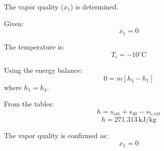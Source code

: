The vapor quality (\( x_1 \)) is determined.  

Given:  
\[
x_1 = 0
\]  

The temperature is:  
\[
T_i = -10^\circ\text{C}
\]  

Using the energy balance:  
\[
0 = \dot{m} \left[ h_4 - h_1 \right]
\]  
where \( h_1 = h_4 \).  

From the tables:  
\[
h = s_{\text{ext}} + s_{40} - s_{5,\text{ext}}
\]  
\[
h = 271.313 \, \text{kJ/kg}
\]  

The vapor quality is confirmed as:  
\[
x_1 = 0
\]